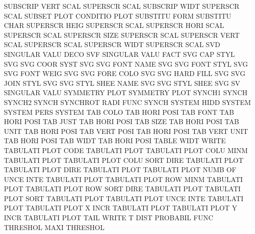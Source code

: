 SUBSCRIP VERT SCAL                      SUPERSCR SCAL
SUBSCRIP WIDT                           SUPERSCR SCAL
SUBSET   PLOT                           CONDITIO PLOT
SUBSTITU FORM                           SUBSTITU CHAR
SUPERSCR HEIG                           SUPERSCR SCAL
SUPERSCR HORI SCAL                      SUPERSCR SCAL
SUPERSCR SIZE                           SUPERSCR SCAL
SUPERSCR VERT SCAL                      SUPERSCR SCAL
SUPERSCR WIDT                           SUPERSCR SCAL
SVD                                     SINGULAR VALU DECO
SVF                                     SINGULAR VALU FACT
SVG      CAP  STYL                      SVG
SVG      COOR SYST                      SVG
SVG      FONT NAME                      SVG
SVG      FONT STYL                      SVG
SVG      FONT WEIG                      SVG
SVG      FORE COLO                      SVG
SVG      HARD FILL                      SVG
SVG      JOIN STYL                      SVG
SVG      STYL SHEE NAME                 SVG
SVG      STYL SHEE                      SVG
SV                                      SINGULAR VALU
SYMMETRY PLOT                           SYMMETRY PLOT
SYNCH1                                  SYNCH
SYNCH2                                  SYNCH
SYNCHROT RADI FUNC                      SYNCH
SYSTEM   HIDD                           SYSTEM
SYSTEM   PERS                           SYSTEM
TAB      COLO                           TAB HORI POSI
TAB      FONT                           TAB HORI POSI
TAB      JUST                           TAB HORI POSI
TAB      SIZE                           TAB HORI POSI
TAB      UNIT                           TAB HORI POSI
TAB      VERT POSI                      TAB HORI POSI
TAB      VERT UNIT                      TAB HORI POSI
TAB      WIDT                           TAB HORI POSI
TABLE    WIDT                           WRITE
TABULATI PLOT CODE                      TABULATI PLOT
TABULATI PLOT COLU MINM                 TABULATI PLOT
TABULATI PLOT COLU SORT DIRE            TABULATI PLOT
TABULATI PLOT DIRE                      TABULATI PLOT
TABULATI PLOT NUMB OF   UNCE INTE       TABULATI PLOT
TABULATI PLOT ROW  MINM                 TABULATI PLOT
TABULATI PLOT ROW  SORT DIRE            TABULATI PLOT
TABULATI PLOT SORT                      TABULATI PLOT
TABULATI PLOT UNCE INTE                 TABULATI PLOT
TABULATI PLOT X    INCR                 TABULATI PLOT
TABULATI PLOT Y    INCR                 TABULATI PLOT
TAIL                                    WRITE
T        DIST                           PROBABIL FUNC
THRESHOL MAXI                           THRESHOL
